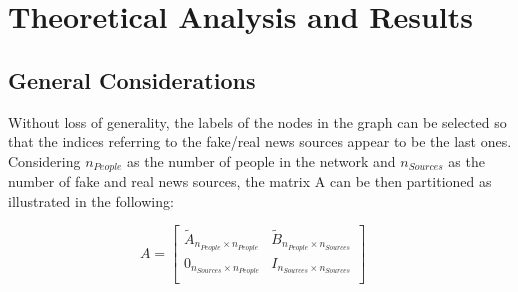 \section{Theoretical Analysis and Results}
\subsection{General Considerations}
Without loss of generality, the labels of the nodes in the graph can be selected so that the indices referring to the fake/real news sources appear to be the last ones. Considering $n_{People}$ as the number of people in the network and $n_{Sources}$ as the number of fake and real news sources, the matrix A can be then partitioned as illustrated in the following:

$$
A = 
\begin{bmatrix}
	\tilde{A}_{n_{People} \times n_{People}} & \tilde{B}_{n_{People} \times n_{Sources}} \\
	0_{n_{Sources} \times n_{People}} & I_{n_{Sources} \times n_{Sources}} \\
\end{bmatrix} 
\quad
$$

